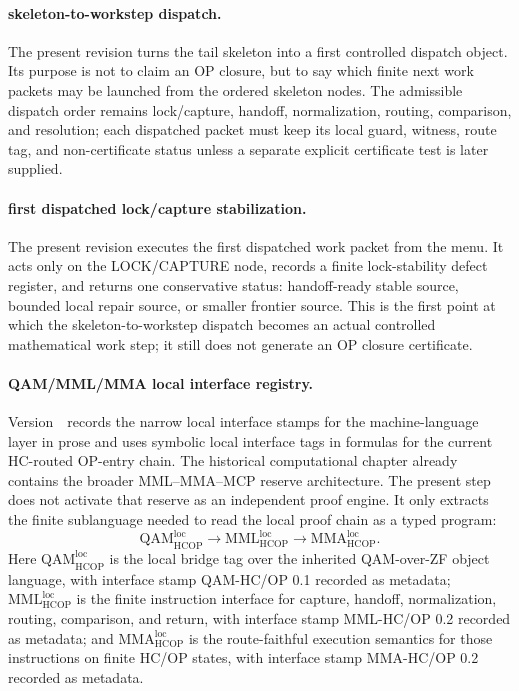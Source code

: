 \paragraph{skeleton-to-workstep dispatch.}
The present revision turns the tail skeleton into a first controlled dispatch object. Its purpose is not to claim an OP closure, but to say which finite next work packets may be launched from the ordered skeleton nodes. The admissible dispatch order remains lock/capture, handoff, normalization, routing, comparison, and resolution; each dispatched packet must keep its local guard, witness, route tag, and non-certificate status unless a separate explicit certificate test is later supplied.

\paragraph{first dispatched lock/capture stabilization.}
The present revision executes the first dispatched work packet from the menu. It acts only on the LOCK/CAPTURE node, records a finite lock-stability defect register, and returns one conservative status: handoff-ready stable source, bounded local repair source, or smaller frontier source. This is the first point at which the skeleton-to-workstep dispatch becomes an actual controlled mathematical work step; it still does not generate an OP closure certificate.


\paragraph{QAM/MML/MMA local interface registry.}
Version~\docversion\ records the narrow local interface stamps for the machine-language layer in prose and uses symbolic local interface tags in formulas for the current HC-routed OP-entry chain. The historical computational chapter already contains the broader MML--MMA--MCP reserve architecture. The present step does not activate that reserve as an independent proof engine. It only extracts the finite sublanguage needed to read the local proof chain as a typed program:
\[
 \mathrm{QAM}_{\mathrm{HCOP}}^{\mathrm{loc}}
 \longrightarrow
 \mathrm{MML}_{\mathrm{HCOP}}^{\mathrm{loc}}
 \longrightarrow
 \mathrm{MMA}_{\mathrm{HCOP}}^{\mathrm{loc}}.
\]
Here \(\mathrm{QAM}_{\mathrm{HCOP}}^{\mathrm{loc}}\) is the local bridge tag over the inherited QAM-over-ZF object language, with interface stamp QAM-HC/OP 0.1 recorded as metadata; \(\mathrm{MML}_{\mathrm{HCOP}}^{\mathrm{loc}}\) is the finite instruction interface for capture, handoff, normalization, routing, comparison, and return, with interface stamp MML-HC/OP 0.2 recorded as metadata; and \(\mathrm{MMA}_{\mathrm{HCOP}}^{\mathrm{loc}}\) is the route-faithful execution semantics for those instructions on finite HC/OP states, with interface stamp MMA-HC/OP 0.2 recorded as metadata.


